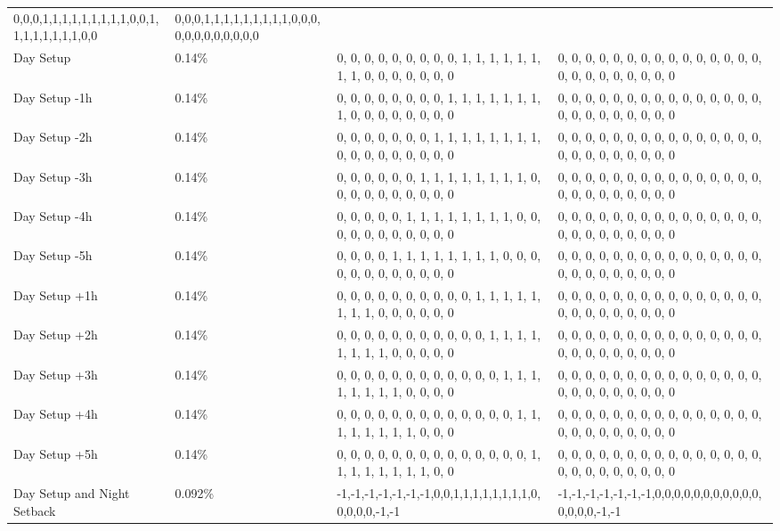 \begin{longtable}[]{@{}llll@{}}
0,0,0,1,1,1,1,1,1,1,1,1,0,0,1,1,1,1,1,1,1,1,0,0 &
0,0,0,1,1,1,1,1,1,1,1,1,0,0,0,0,0,0,0,0,0,0,0,0 \\
Day Setup & 0.14\% & 0, 0, 0, 0, 0, 0, 0, 0, 0, 1, 1, 1, 1, 1, 1, 1, 1,
0, 0, 0, 0, 0, 0, 0 & 0, 0, 0, 0, 0, 0, 0, 0, 0, 0, 0, 0, 0, 0, 0, 0, 0,
0, 0, 0, 0, 0, 0, 0 \\
Day Setup -1h & 0.14\% & 0, 0, 0, 0, 0, 0, 0, 0, 1, 1, 1, 1, 1, 1, 1, 1,
0, 0, 0, 0, 0, 0, 0, 0 & 0, 0, 0, 0, 0, 0, 0, 0, 0, 0, 0, 0, 0, 0, 0, 0,
0, 0, 0, 0, 0, 0, 0, 0 \\
Day Setup -2h & 0.14\% & 0, 0, 0, 0, 0, 0, 0, 1, 1, 1, 1, 1, 1, 1, 1, 0,
0, 0, 0, 0, 0, 0, 0, 0 & 0, 0, 0, 0, 0, 0, 0, 0, 0, 0, 0, 0, 0, 0, 0, 0,
0, 0, 0, 0, 0, 0, 0, 0 \\
Day Setup -3h & 0.14\% & 0, 0, 0, 0, 0, 0, 1, 1, 1, 1, 1, 1, 1, 1, 0, 0,
0, 0, 0, 0, 0, 0, 0, 0 & 0, 0, 0, 0, 0, 0, 0, 0, 0, 0, 0, 0, 0, 0, 0, 0,
0, 0, 0, 0, 0, 0, 0, 0 \\
Day Setup -4h & 0.14\% & 0, 0, 0, 0, 0, 1, 1, 1, 1, 1, 1, 1, 1, 0, 0, 0,
0, 0, 0, 0, 0, 0, 0, 0 & 0, 0, 0, 0, 0, 0, 0, 0, 0, 0, 0, 0, 0, 0, 0, 0,
0, 0, 0, 0, 0, 0, 0, 0 \\
Day Setup -5h & 0.14\% & 0, 0, 0, 0, 1, 1, 1, 1, 1, 1, 1, 1, 0, 0, 0, 0,
0, 0, 0, 0, 0, 0, 0, 0 & 0, 0, 0, 0, 0, 0, 0, 0, 0, 0, 0, 0, 0, 0, 0, 0,
0, 0, 0, 0, 0, 0, 0, 0 \\
Day Setup +1h & 0.14\% & 0, 0, 0, 0, 0, 0, 0, 0, 0, 0, 1, 1, 1, 1, 1, 1,
1, 1, 0, 0, 0, 0, 0, 0 & 0, 0, 0, 0, 0, 0, 0, 0, 0, 0, 0, 0, 0, 0, 0, 0,
0, 0, 0, 0, 0, 0, 0, 0 \\
Day Setup +2h & 0.14\% & 0, 0, 0, 0, 0, 0, 0, 0, 0, 0, 0, 1, 1, 1, 1, 1,
1, 1, 1, 0, 0, 0, 0, 0 & 0, 0, 0, 0, 0, 0, 0, 0, 0, 0, 0, 0, 0, 0, 0, 0,
0, 0, 0, 0, 0, 0, 0, 0 \\
Day Setup +3h & 0.14\% & 0, 0, 0, 0, 0, 0, 0, 0, 0, 0, 0, 0, 1, 1, 1, 1,
1, 1, 1, 1, 0, 0, 0, 0 & 0, 0, 0, 0, 0, 0, 0, 0, 0, 0, 0, 0, 0, 0, 0, 0,
0, 0, 0, 0, 0, 0, 0, 0 \\
Day Setup +4h & 0.14\% & 0, 0, 0, 0, 0, 0, 0, 0, 0, 0, 0, 0, 0, 1, 1, 1,
1, 1, 1, 1, 1, 0, 0, 0 & 0, 0, 0, 0, 0, 0, 0, 0, 0, 0, 0, 0, 0, 0, 0, 0,
0, 0, 0, 0, 0, 0, 0, 0 \\
Day Setup +5h & 0.14\% & 0, 0, 0, 0, 0, 0, 0, 0, 0, 0, 0, 0, 0, 0, 1, 1,
1, 1, 1, 1, 1, 1, 0, 0 & 0, 0, 0, 0, 0, 0, 0, 0, 0, 0, 0, 0, 0, 0, 0, 0,
0, 0, 0, 0, 0, 0, 0, 0 \\
Day Setup and Night Setback & 0.092\% &
-1,-1,-1,-1,-1,-1,-1,0,0,1,1,1,1,1,1,1,1,0,0,0,0,0,-1,-1 &
-1,-1,-1,-1,-1,-1,-1,0,0,0,0,0,0,0,0,0,0,0,0,0,0,0,-1,-1 \\

\end{longtable}
